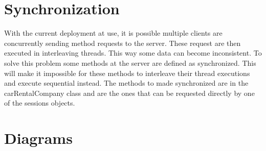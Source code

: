 \documentclass[]{article}
\begin{document}
\section{Synchronization}
With the current deployment at use, it is possible multiple clients are concurrently sending method requests to the server. These request are then executed in interleaving threads. This way some data can become inconsistent. To solve this problem some methods at the server are defined as synchronized. This will make it impossible for these methods to interleave their thread executions and execute sequential instead. The methods to made synchronized are in the carRentalCompany class and are the ones that can be requested directly by one of the sessions objects.
\clearpage
\section{Diagrams}
\end{document}
